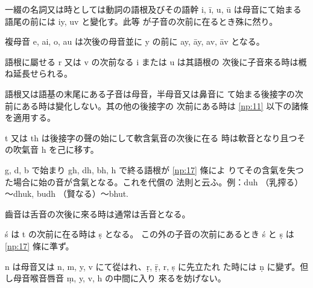 \numberParagraph
一綴の名詞又は時としては動詞の語根及びその語幹 i,
ī, u, ū は母音にて始まる語尾の前には iy, uv と變化す。此等
が子音の次前に在るとき殊に然り。

\numberParagraph \label{np:31}
複母音 e, ai, o, au は次後の母音並に y の前に ay, āy,
av, āv となる。

\numberParagraph
語根に屬せる r 又は v の次前なる i または u は其語根の
次後に子音來る時は槪ね延長せられる。

\numberParagraph
語根又は語基の末尾にある子音は母音，半母音又は鼻音に
て始まる後接字の次前にある時は變化しない。其の他の後接字の
次前にある時は \ref{np:11} 以下の諸條を適用する。

\numberParagraph
t 又は th は後接字の聲の始にして軟含氣音の次後に在る
時は軟音となり且つその吹氣音 h を己に移す。

\numberParagraph \label{np:35}
g, d, b で始まり gh, dh, bh, h で終る語根が \ref{np:17} 條によ
りてその含氣を失つた場合に始の音が含氣となる。これを代償の
法則と云ふ。例：duh （乳搾る）～dhuk, budh （賢なる）～bhut.

\numberParagraph \label{np:36}
齒音は舌音の次後に來る時は通常は舌音となる。

\numberParagraph
ś は t の次前に在る時は ṣ となる。
この外の子音の次前にあるとき ś と ṣ は \ref{np:17} 條に準ず。

\numberParagraph
n は母音又は n, m, y, v にて從はれ、ṛ, ṝ, r, ṣ に先立たれ
た時には ṇ に變ず。但し母音喉音唇音 ṃ, y, v, h の中間に入り
來るを妨げない。

